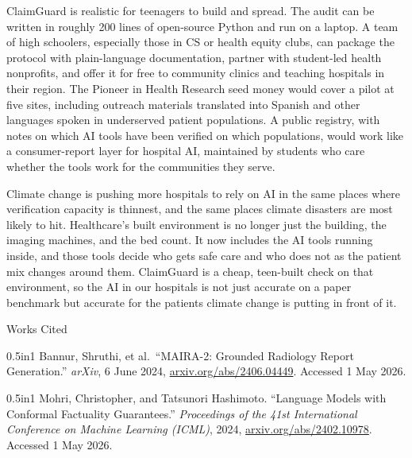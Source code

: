 \documentclass[12pt,letterpaper]{article}
\begin{document}
ClaimGuard is realistic for teenagers to build and spread. The audit can be written in roughly 200 lines of open-source Python and run on a laptop. A team of high schoolers, especially those in CS or health equity clubs, can package the protocol with plain-language documentation, partner with student-led health nonprofits, and offer it for free to community clinics and teaching hospitals in their region. The Pioneer in Health Research seed money would cover a pilot at five sites, including outreach materials translated into Spanish and other languages spoken in underserved patient populations. A public registry, with notes on which AI tools have been verified on which populations, would work like a consumer-report layer for hospital AI, maintained by students who care whether the tools work for the communities they serve.

Climate change is pushing more hospitals to rely on AI in the same places where verification capacity is thinnest, and the same places climate disasters are most likely to hit. Healthcare's built environment is no longer just the building, the imaging machines, and the bed count. It now includes the AI tools running inside, and those tools decide who gets safe care and who does not as the patient mix changes around them. ClaimGuard is a cheap, teen-built check on that environment, so the AI in our hospitals is not just accurate on a paper benchmark but accurate for the patients climate change is putting in front of it.

\vspace{1em}

\begin{center}
Works Cited
\end{center}

\begin{hangparas}{0.5in}{1}
Bannur, Shruthi, et al.\ ``MAIRA-2: Grounded Radiology Report Generation.'' \textit{arXiv}, 6 June 2024, \url{arxiv.org/abs/2406.04449}. Accessed 1 May 2026.
\end{hangparas}

\vspace{0.5em}

\begin{hangparas}{0.5in}{1}
Mohri, Christopher, and Tatsunori Hashimoto. ``Language Models with Conformal Factuality Guarantees.'' \textit{Proceedings of the 41st International Conference on Machine Learning (ICML)}, 2024, \url{arxiv.org/abs/2402.10978}. Accessed 1 May 2026.
\end{hangparas}
\end{document}
